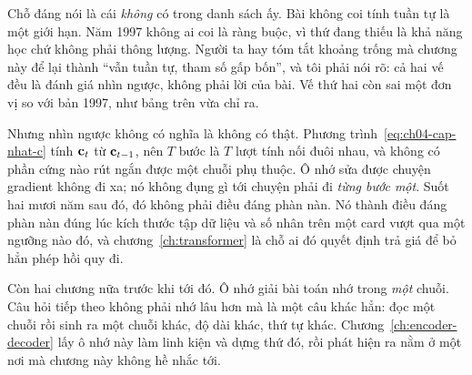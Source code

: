 Chỗ đáng nói là cái \emph{không} có trong danh sách ấy. Bài không coi tính tuần
tự là một giới hạn. Năm 1997 không ai coi  là
ràng buộc, vì thứ
đang thiếu là khả năng học chứ không phải thông lượng. Người ta hay tóm tắt
khoảng trống mà chương này để lại thành \enquote{vẫn tuần tự, tham số gấp
bốn}, và tôi phải nói rõ: cả hai vế đều là đánh giá nhìn ngược, không phải lời
của bài. Vế thứ hai còn sai một đơn vị so với bản 1997, như bảng trên vừa chỉ
ra.

Nhưng nhìn ngược không có nghĩa là không có thật.
Phương trình~\eqref{eq:ch04-cap-nhat-c} tính \(\mathbf{c}_t\) từ
\(\mathbf{c}_{t-1}\), nên \(T\) bước là \(T\) lượt tính nối đuôi nhau, và không
có phần cứng nào rút ngắn được một chuỗi phụ thuộc. Ô nhớ sửa được chuyện
gradient không đi xa; nó không đụng gì tới chuyện phải đi \emph{từng bước một}.
Suốt hai mươi năm sau đó, đó không phải điều đáng phàn nàn. Nó thành điều đáng
phàn nàn đúng lúc kích thước tập dữ liệu và số nhân trên một card vượt qua một
ngưỡng nào đó, và chương~\ref{ch:transformer} là chỗ ai đó quyết định trả giá
để bỏ hẳn phép hồi quy đi.

Còn hai chương nữa trước khi tới đó. Ô nhớ giải bài toán nhớ trong \emph{một}
chuỗi. Câu hỏi tiếp theo không phải nhớ lâu hơn mà là một câu khác hẳn: đọc một
chuỗi rồi sinh ra một chuỗi khác, độ dài khác, thứ tự khác.
Chương~\ref{ch:encoder-decoder} lấy ô nhớ này làm linh kiện và dựng thứ đó, rồi
phát hiện ra  nằm ở một nơi mà chương này không hề
nhắc tới.
